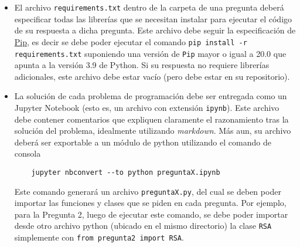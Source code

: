 \begin{itemize}

  \item El archivo \texttt{requirements.txt} dentro de la carpeta de una pregunta deberá especificar todas las librerías que se necesitan instalar para ejecutar el código de su respuesta a dicha pregunta. Este archivo debe seguir la especificación de \href{https://pypi.org/project/pip/}{Pip}, es decir se debe poder ejecutar el comando \texttt{pip install -r requirements.txt} suponiendo una versión de \texttt{Pip} mayor o igual a 20.0 que apunta a la versión 3.9 de Python. Si su respuesta no requiere librerías adicionales, este archivo debe estar vacío (pero debe estar en su repositorio).

\item La solución de cada problema de programación debe ser entregada como un Jupyter Notebook (esto es, un archivo con extensión \texttt{ipynb}). Este archivo debe contener comentarios que expliquen claramente el razonamiento tras la solución del problema, idealmente utilizando \emph{markdown}. Más aun, su archivo deberá ser exportable a un módulo de python utilizando el comando de consola
\begin{verbatim}
    jupyter nbconvert --to python preguntaX.ipynb
\end{verbatim}
Este comando generará un archivo \texttt{preguntaX.py}, del cual se deben poder importar las funciones y clases que se piden en cada pregunta. Por ejemplo, para la Pregunta 2, luego de ejecutar este comando, se debe poder importar desde otro archivo python (ubicado en el mismo directorio) la clase \texttt{RSA} simplemente con \texttt{from pregunta2 import RSA}.


\end{itemize}
